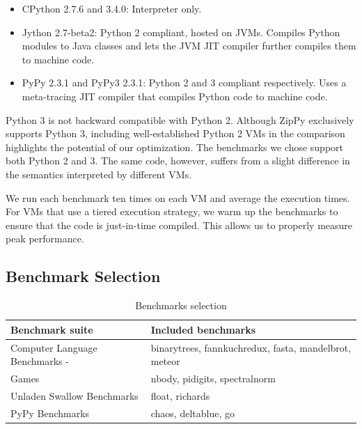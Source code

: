\begin{itemize}

\item CPython 2.7.6 and 3.4.0: Interpreter only.

\item Jython 2.7-beta2:
Python 2 compliant, hosted on JVMs.
Compiles Python modules to Java classes and lets the JVM JIT compiler further compiles them to machine code.

\item PyPy 2.3.1 and PyPy3 2.3.1: Python 2 and 3 compliant respectively.
Uses a meta-tracing JIT compiler that compiles Python code to machine code.

\end{itemize}

Python 3 is not backward compatible with Python 2.
Although ZipPy exclusively supports Python 3, including well-established Python 2 VMs in the comparison highlights the potential of our optimization.
The benchmarks we chose support both Python 2 and 3.
The same code, however, suffers from a slight difference in the semantics interpreted by different VMs.

We run each benchmark ten times on each VM and average the execution times.
For VMs that use a tiered execution strategy, we warm up the benchmarks to ensure that the code is just-in-time compiled.
This allows us to properly measure peak performance.

\subsection{Benchmark Selection}

\begin{table}
  \begin{center}
    \begin{tabular}{ l l }
    \toprule
    Benchmark suite & Included benchmarks \\
    \midrule
	Computer Language Benchmarks - & \textsf{binarytrees}, \textsf{fannkuchredux}, \textsf{fasta}, \textsf{mandelbrot}, \textsf{meteor} \\
	Games & \textsf{nbody}, \textsf{pidigits}, \textsf{spectralnorm} \\
	\midrule
	Unladen Swallow Benchmarks &  \textsf{float}, \textsf{richards} \\
	\midrule
	PyPy Benchmarks & \textsf{chaos}, \textsf{deltablue}, \textsf{go} \\
    \bottomrule
	\end{tabular}
    \caption{Benchmarks selection}
    \label{tab:ch6-regular-benchmark-selection}
  \end{center}
\end{table}

